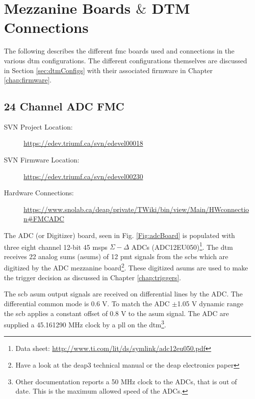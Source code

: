 
\section{Mezzanine Boards $\&$ DTM Connections}
The following describes the different \gls{fmc} boards used and connections in the various \gls{dtm} configurations. The different configurations themselves are discussed in Section \ref{sec:dtmConfigs} with their associated firmware in Chapter \ref{chap:firmware}.

\subsection{24 Channel ADC FMC}
\label{sec:adcBoard}
\begin{description}
\item[SVN Project Location: ]\url{https://edev.triumf.ca/svn/edevel00018}
\item[SVN Firmware Location: ]\url{https://edev.triumf.ca/svn/edevel00230}
\item[Hardware Connections: ]\url{https://www.snolab.ca/deap/private/TWiki/bin/view/Main/HWconnection#FMCADC}
\end{description}
The ADC (or Digitizer) board, seen in Fig. \ref{Fig:adcBoard} is populated with three eight channel 12-bit 45 \gls{msps} $\Sigma - \Delta$ ADCs (ADC12EU050)\footnote{Data sheet: \url{http://www.ti.com/lit/ds/symlink/adc12eu050.pdf}}. 
The \gls{dtm} receives 22 analog sums (\gls{asum}s) of 12 \gls{pmt} signals from the \gls{scb}s which are digitized by the ADC mezzanine board\footnote{Have a look at the \gls{deap3} technical manual or the \gls{deap} electronics paper}. These digitized \gls{asum}s are used to make the trigger decision as discussed in Chapter \ref{chap:triggers}. 

The \gls{scb} \gls{asum} output signals are received on differential lines by the ADC. The differential common mode is 0.6 V.
To match the ADC $\pm$1.05 V dynamic range the \gls{scb} applies a constant offset of 0.8 V to the \gls{asum} signal.
The ADC are supplied a 45.161290 MHz clock by a \gls{pll} on the \gls{dtm}\footnote{Other documentation reports a 50 MHz clock to the ADCs, that is out of date. This is the maximum allowed speed of the ADCs.}.


